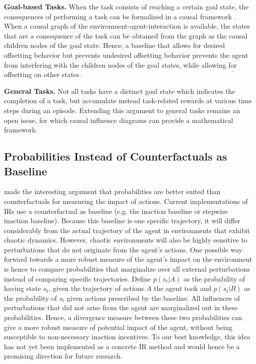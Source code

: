 \documentclass[letterpaper]{article} %
\newcommand{\statement}[1]{\textbf{#1}}
\begin{document}
\statement{Goal-based Tasks.} When the task consists of reaching a certain goal state, the consequences of performing a task can be formalized in a causal framework \citep{pearl2009causality}. When a causal graph of the environment-agent-interaction is available, the states that are a consequence of the task can be obtained from the graph as the causal children nodes of the goal state. Hence, a baseline that allows for desired offsetting behavior but prevents undesired offsetting behavior prevents the agent from interfering with the children nodes of the goal states, while allowing for offsetting on other states.

\statement{General Tasks.} Not all tasks have a distinct goal state which indicates the completion of a task, but accumulate instead task-related rewards at various time steps during an episode. Extending this argument to general tasks remains an open issue, for which causal influence diagrams \citep{everitt2019understanding} can provide a mathematical framework. 

\subsection{Probabilities Instead of Counterfactuals as Baseline}
\citet{armstrong2017low} made the interesting argument that probabilities are better suited than counterfactuals for measuring the impact of actions. Current implementations of IRs use a counterfactual as baseline (e.g. the inaction baseline or stepwise inaction baseline). Because this baseline is one specific trajectory, it will differ considerably from the actual trajectory of the agent in environments that exhibit chaotic dynamics. However, chaotic environments will also be highly sensitive to perturbations that do not originate from the agent's actions. One possible way forward towards a more robust measure of the agent's impact on the environment is hence to compare probabilities that marginalize over all external perturbations instead of comparing specific trajectories. Define $p(s_t|A)$ as the probability of having state $s_t$, given the trajectory of actions $A$ the agent took and $p(s_t|B)$ as the probability of $s_t$ given actions prescribed by the baseline. All influences of perturbations that did not arise from the agent are marginalized out in these probabilities. Hence, a divergence measure between these two probabilities can give a more robust measure of potential impact of the agent, without being susceptible to non-necessary inaction incentives.
To our best knowledge, this idea has not yet been implemented as a concrete IR method and would hence be a promising direction for future research.
\end{document}
